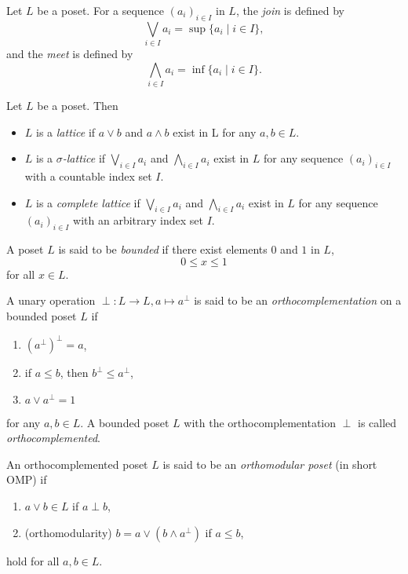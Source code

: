 Let \(L\) be a poset. For a sequence \((a_i)_{i\in I}\) in \(L\), the \emph{join} is defined by \[\bigvee_{i \in I} a_i = \sup \{a_i \mid i \in I\},\]
and the \emph{meet} is defined by
    \[\bigwedge_{i \in I} a_i = \inf \{a_i \mid i \in I\}.\]
    \begin{definition}
        Let \(L\) be a poset. Then
        \begin{itemize}
            \item \(L\) is a \emph{lattice} if \(a\vee b\) and \(a \wedge b\) exist in L for any \(a,b \in L\).
            \item \(L\) is a \emph{\(\sigma\)-lattice} if \(\bigvee_{i \in I} a_i\) and \(\bigwedge_{i\in I} a_i\) exist in \(L\) for any sequence \((a_i)_{i\in I}\) with a countable index set \(I\).
            \item \(L\) is a \emph{complete lattice} if \(\bigvee_{i \in I} a_i\) and \(\bigwedge_{i \in I} a_i\) exist in \(L\) for any sequence \((a_i)_{i\in I}\) with an arbitrary index set \(I\).
        \end{itemize}
    \end{definition}
\begin{definition}
    A poset \(L\) is said to be \emph{bounded} if there exist elements \(0\) and \(1\) in \(L\),
    \[0\le x \le 1\]
    for all \(x \in L\).
\end{definition}
A unary operation \(\perp: L \to L, a \mapsto a^\perp\) is said to be an \emph{orthocomplementation} on a bounded poset \(L\) if
\begin{enumerate}
    \item \((a^\perp)^\perp=a\),
    \item if \(a \le b\), then \(b^\perp\le a^\perp\),
    \item \(a\vee a^\perp=1\)
\end{enumerate}
for any \(a,b \in L\). A bounded poset \(L\) with the orthocomplementation \(\perp\) is called \emph{orthocomplemented}.
\begin{definition}
    An orthocomplemented poset \(L\) is said to be an \emph{orthomodular poset} (in short OMP) if
    \begin{enumerate}
        \item \(a \vee b \in L\) if \(a\perp b\),
        \item (orthomodularity) \(b=a\vee(b \wedge a^\perp)\) if \(a \le b\),
    \end{enumerate}
    hold for all \(a,b \in L\).
\end{definition}

